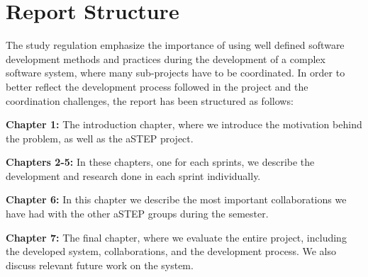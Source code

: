 \section{Report Structure} \label{sec:report_structure}
The study regulation emphasize the importance of using well defined software development methods and practices during the development of a complex software system, where many sub-projects have to be coordinated. In order to better reflect the development process followed in the project and the coordination challenges, the report has been structured as follows:

\textbf{Chapter 1:} The introduction chapter, where we introduce the motivation behind the problem, as well as the aSTEP project.

\textbf{Chapters 2-5:} In these chapters, one for each sprints, we describe the development and research done in each sprint individually.

\textbf{Chapter 6:} In this chapter we describe the most important collaborations we have had with the other aSTEP groups during the semester. 

\textbf{Chapter 7:} The final chapter, where we evaluate the entire project, including the developed system, collaborations, and the development process. We also discuss relevant future work on the system.